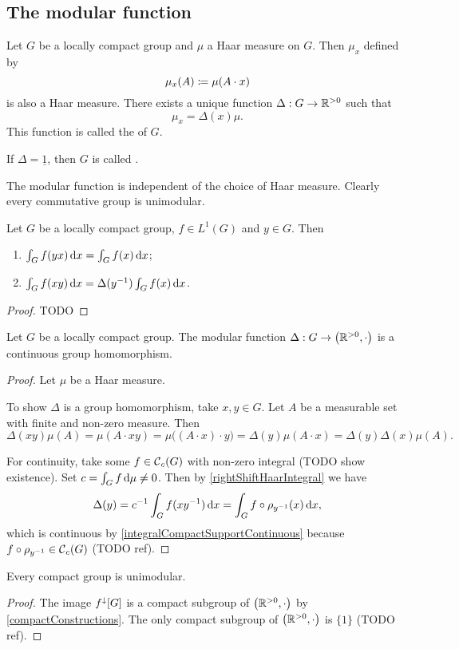 \subsection{The modular function}
\begin{definition}
Let $G$ be a locally compact group and $\mu$ a Haar measure on $G$. Then $\mu_x$ defined by
\[ \mu_x(A) \coloneqq \mu(A \cdot x) \]
is also a Haar measure. There exists a unique function $\Delta: G \to \mathbb{R}^{> 0}$ such that
\[ \mu_x = \Delta(x)\mu. \]
This function is called the  of $G$.

If $\Delta = \underline{1}$, then $G$ is called .
\end{definition}
The modular function is independent of the choice of Haar measure. Clearly every commutative group is unimodular.

\begin{lemma} \label{rightShiftHaarIntegral}
Let $G$ be a locally compact group, $f\in L^1(G)$ and $y\in G$. Then
\begin{enumerate}
\item $\int_G f(yx)\operatorname{d \!}{x} = \int_G f(x)\operatorname{d \!}{x}$;
\item $\int_G f(xy)\operatorname{d \!}{x} = \Delta(y^{-1})\int_G f(x)\operatorname{d \!}{x}$.
\end{enumerate}
\end{lemma}
\begin{proof}
TODO 
\end{proof}

\begin{proposition}
Let $G$ be a locally compact group. The modular function $\Delta: G \to \left( \mathbb{R}^{> 0},\cdot \right)$ is a continuous group homomorphism.
\end{proposition}
\begin{proof}
Let $\mu$ be a Haar measure.

To show $\Delta$ is a group homomorphism, take $x,y\in G$. Let $A$ be a measurable set with finite and non-zero measure. Then
\[ \Delta(xy)\mu(A) = \mu(A \cdot xy) = \mu\big((A\cdot x)\cdot y\big) = \Delta(y)\mu(A\cdot x) = \Delta(y)\Delta(x)\mu(A). \]

For continuity, take some $f\in\operatorname{\mathcal{C}}_c(G)$ with non-zero integral (TODO show existence). Set $c = \int_G f\operatorname{d \!}{\mu} \neq 0$. Then by \ref{rightShiftHaarIntegral} we have
\[ \Delta(y) = c^{-1}\int_G f(xy^{-1})\operatorname{d \!}{x} = \int_G f\circ \rho_{y^{-1}}(x)\operatorname{d \!}{x}, \]
which is continuous by \ref{integralCompactSupportContinuous} because $f\circ \rho_{y^{-1}} \in \operatorname{\mathcal{C}}_c(G)$ (TODO ref).
\end{proof}
\begin{corollary}
Every compact group is unimodular.
\end{corollary}
\begin{proof}
The image $f^{\downarrow}[G]$ is a compact subgroup of $\left( \mathbb{R}^{> 0},\cdot \right)$ by \ref{compactConstructions}. The only compact subgroup of $\left( \mathbb{R}^{> 0},\cdot \right)$ is $\{1\}$ (TODO ref).
\end{proof}


